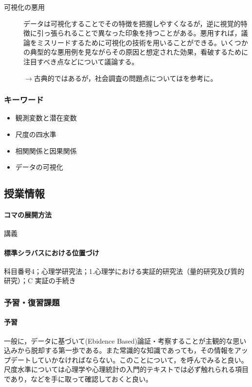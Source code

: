 \begin{description}
\item[可視化の悪用] データは可視化することでその特徴を把握しやすくなるが，逆に視覚的特徴に引っ張られることで異なった印象を持つことがある。悪用すれば，議論をミスリードするために可視化の技術を用いることができる。いくつかの典型的な悪用例を見ながらその原因と想定された効果，看破するために注目すべき点などについて議論する。
\begin{flushright}
    $\to$古典的ではあるが\citet{高木196807}，社会調査の問題点については\citet{谷岡200006}を参考に。
\end{flushright}

\end{description}
\subsubsection{キーワード}
\begin{itemize}
\item 観測変数と潜在変数
\item 尺度の四水準
\item 相関関係と因果関係
\item データの可視化
\end{itemize}
\subsection{授業情報}
\paragraph{コマの展開方法}
講義
\paragraph{標準シラバスにおける位置づけ}
科目番号4；心理学研究法；1.心理学における実証的研究法（量的研究及び質的研究）；C 実証の手続き
\subsubsection{予習・復習課題}
\paragraph{予習}
一般に，データに基づいて(Ebidence Based)論証・考察することが主観的な思い込みから脱却する第一歩である。また常識的な知識であっても，その情報をアップデートしていかなければならない。このことについて，\citet{Rosling2019}を呼んでみると良い。尺度水準については心理学や心理統計の入門的テキストでは必ず触れられる項目であり，\citet{三浦201705,川端201408,Yamada2004,kosugi2018,kosugi2019}などを手に取って確認しておくと良い。
